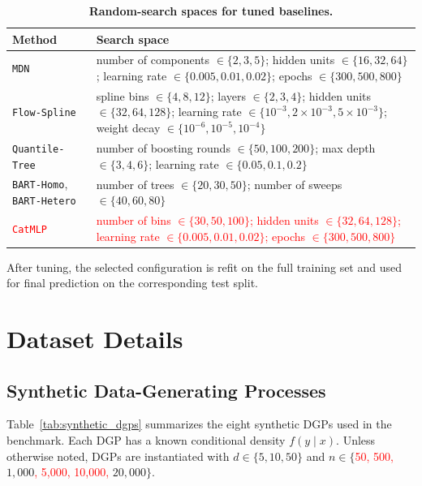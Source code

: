 \documentclass{article}
\newcommand{\method}[1]{\texttt{#1}}
\begin{document}
\begin{table}[t]
\centering
\caption{\textbf{Random-search spaces for tuned baselines.}}
\label{tab:hyperparams}
\small
\begin{tabular}{lp{9cm}}
\toprule
\textbf{Method} & \textbf{Search space} \\
\midrule
\method{MDN} &
number of components $\in \{2,3,5\}$; hidden units $\in \{16,32,64\}$;
learning rate $\in \{0.005,0.01,0.02\}$; epochs $\in \{300,500,800\}$ \\
\method{Flow-Spline} &
spline bins $\in \{4,8,12\}$; layers $\in \{2,3,4\}$;
hidden units $\in \{32,64,128\}$;
learning rate $\in \{10^{-3},2\times 10^{-3},5\times 10^{-3}\}$;
weight decay $\in \{10^{-6},10^{-5},10^{-4}\}$ \\
\method{Quantile-Tree} &
number of boosting rounds $\in \{50,100,200\}$;
max depth $\in \{3,4,6\}$;
learning rate $\in \{0.05,0.1,0.2\}$ \\
\method{BART-Homo}, \method{BART-Hetero} &
number of trees $\in \{20,30,50\}$;
number of sweeps $\in \{40,60,80\}$ \\
\textcolor{red}{\method{CatMLP}} &
\textcolor{red}{number of bins $\in \{30,50,100\}$; hidden units $\in \{32,64,128\}$;
learning rate $\in \{0.005,0.01,0.02\}$; epochs $\in \{300,500,800\}$} \\
\bottomrule
\end{tabular}
\end{table}

After tuning, the selected configuration is refit on the full training set and
used for final prediction on the corresponding test split.


\section{Dataset Details}
\label{app:datasets}

\subsection{Synthetic Data-Generating Processes}
\label{app:synthetic_dgps}

Table~\ref{tab:synthetic_dgps} summarizes the eight synthetic DGPs used in the
benchmark. Each DGP has a known conditional density $f(y\mid x)$. Unless
otherwise noted, DGPs are instantiated with
$d\in\{5,10,50\}$ and
$n\in\{$\textcolor{red}{50, 500,} $1{,}000$\textcolor{red}{, 5{,}000, 10{,}000,} $20{,}000\}$.
\end{document}
